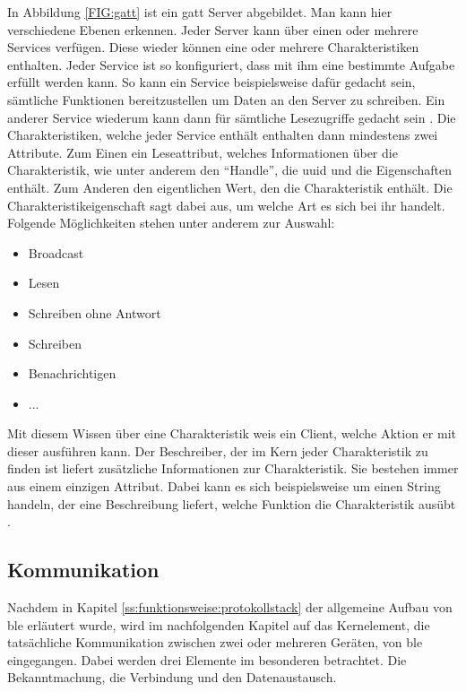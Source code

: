 \noindent In Abbildung \ref{FIG:gatt} ist ein \ac{gatt} Server abgebildet. Man kann hier verschiedene Ebenen erkennen. Jeder Server kann über einen oder mehrere Services verfügen. Diese wieder können eine oder mehrere Charakteristiken enthalten. Jeder Service ist so konfiguriert, dass mit ihm eine bestimmte Aufgabe erfüllt werden kann. So kann ein Service beispielsweise dafür gedacht sein, sämtliche Funktionen bereitzustellen um Daten an den Server zu schreiben. Ein anderer Service wiederum kann dann für sämtliche Lesezugriffe gedacht sein \cite[Seite 32]{Usama17:BBS}. Die Charakteristiken, welche jeder Service enthält enthalten dann mindestens zwei Attribute. Zum Einen ein Leseattribut, welches Informationen über die Charakteristik, wie unter anderem den "`Handle"', die \ac{uuid} und die Eigenschaften enthält. Zum Anderen den eigentlichen Wert, den die Charakteristik enthält. Die Charakteristikeigenschaft sagt dabei aus, um welche Art es sich bei ihr handelt. Folgende Möglichkeiten stehen unter anderem zur Auswahl: 
\begin{itemize}
	\item{Broadcast}
	\item{Lesen}
	\item{Schreiben ohne Antwort}
	\item{Schreiben}
	\item{Benachrichtigen}
	\item{...}
\end{itemize} 
Mit diesem Wissen über eine Charakteristik weis ein Client, welche Aktion er mit dieser ausführen kann. Der Beschreiber, der im Kern jeder Charakteristik zu finden ist liefert zusätzliche Informationen zur Charakteristik. Sie bestehen immer aus einem einzigen Attribut. Dabei kann es sich beispielsweise um einen String handeln, der eine Beschreibung liefert, welche Funktion die Charakteristik ausübt \cite[Seite 59ff]{Townsend14:GSB}.\\ 

\subsection{Kommunikation}
\label{ss:funktionsweise:kommunkation}

Nachdem in Kapitel \ref{ss:funktionsweise:protokollstack} der allgemeine Aufbau von \ac{ble} erläutert wurde, wird im nachfolgenden Kapitel auf das Kernelement, die tatsächliche Kommunikation zwischen zwei oder mehreren Geräten, von \ac{ble} eingegangen. Dabei werden drei Elemente im besonderen betrachtet. Die Bekanntmachung, die Verbindung und den Datenaustausch.\\

